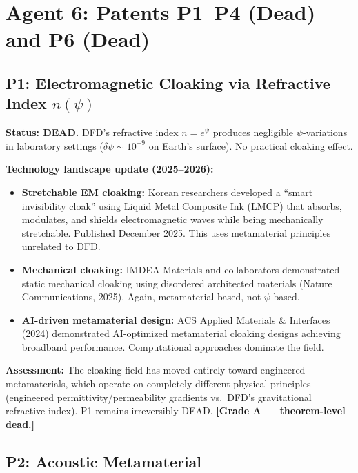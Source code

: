 \documentclass[11pt]{article}
\begin{document}
\section{Agent 6: Patents P1--P4 (Dead) and P6 (Dead)}

\subsection{P1: Electromagnetic Cloaking via Refractive Index $n(\psi)$}

\textbf{Status: DEAD.} DFD's refractive index $n = e^\psi$ produces
negligible $\psi$-variations in laboratory settings ($\delta\psi \sim
10^{-9}$ on Earth's surface). No practical cloaking effect.

\textbf{Technology landscape update (2025--2026):}
\begin{itemize}
  \item \textbf{Stretchable EM cloaking:} Korean researchers developed
    a ``smart invisibility cloak'' using Liquid Metal Composite Ink (LMCP)
    that absorbs, modulates, and shields electromagnetic waves while
    being mechanically stretchable. Published December 2025. This uses
    metamaterial principles unrelated to DFD.
  \item \textbf{Mechanical cloaking:} IMDEA Materials and collaborators
    demonstrated static mechanical cloaking using disordered architected
    materials (Nature Communications, 2025). Again, metamaterial-based,
    not $\psi$-based.
  \item \textbf{AI-driven metamaterial design:} ACS Applied Materials
    \& Interfaces (2024) demonstrated AI-optimized metamaterial cloaking
    designs achieving broadband performance. Computational approaches
    dominate the field.
\end{itemize}

\textbf{Assessment:} The cloaking field has moved entirely toward
engineered metamaterials, which operate on completely different physical
principles (engineered permittivity/permeability gradients vs.\ DFD's
gravitational refractive index). P1 remains irreversibly DEAD.
\textbf{[Grade A --- theorem-level dead.]}

\subsection{P2: Acoustic Metamaterial}
\end{document}
